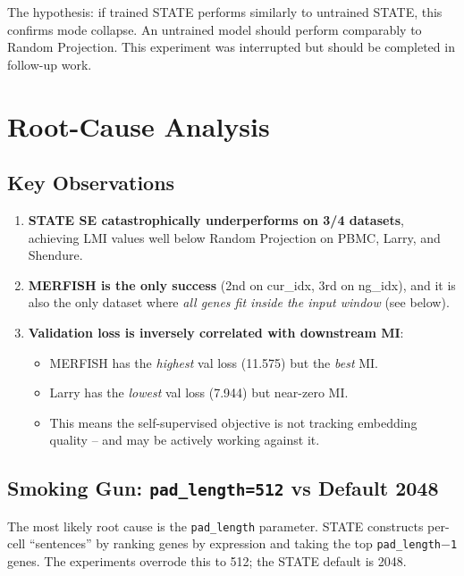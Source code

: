 \documentclass[11pt,a4paper]{article}
\begin{document}
\noindent The hypothesis: if trained STATE performs similarly to untrained STATE, this confirms mode collapse. An untrained model should perform comparably to Random Projection. This experiment was interrupted but should be completed in follow-up work.

\section{Root-Cause Analysis}

\subsection{Key Observations}

\begin{enumerate}
    \item \textbf{STATE SE catastrophically underperforms on 3/4 datasets}, achieving LMI values well below Random Projection on PBMC, Larry, and Shendure.
    \item \textbf{MERFISH is the only success} (2nd on cur\_idx, 3rd on ng\_idx), and it is also the only dataset where \emph{all genes fit inside the input window} (see below).
    \item \textbf{Validation loss is inversely correlated with downstream MI}:
    \begin{itemize}
        \item MERFISH has the \emph{highest} val loss (11.575) but the \emph{best} MI.
        \item Larry has the \emph{lowest} val loss (7.944) but near-zero MI.
        \item This means the self-supervised objective is not tracking embedding quality -- and may be actively working against it.
    \end{itemize}
\end{enumerate}

\subsection{Smoking Gun: \texttt{pad\_length=512} vs Default 2048}

The most likely root cause is the \texttt{pad\_length} parameter. STATE constructs per-cell ``sentences'' by ranking genes by expression and taking the top \texttt{pad\_length$-$1} genes. The experiments overrode this to 512; the STATE default is 2048.
\end{document}
